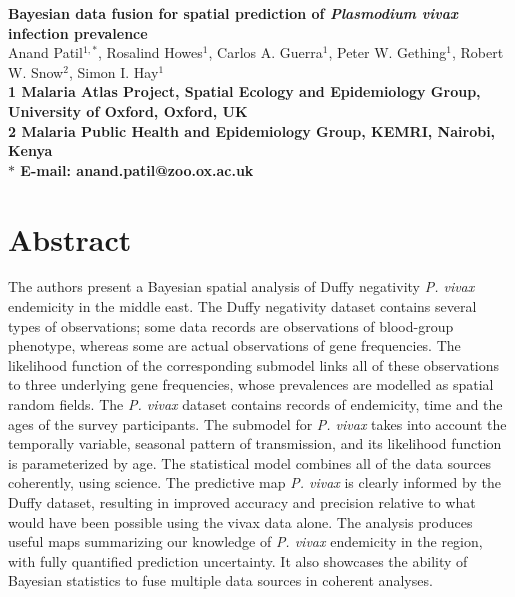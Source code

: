 \documentclass[10pt]{article}
\date{}
\begin{document}
\garamond

\begin{flushleft}
{\Large
\textbf{Bayesian data fusion for spatial prediction of \emph{Plasmodium vivax} infection prevalence}
}
\\
Anand Patil$^{1,\ast}$,  
Rosalind Howes$^{1}$,
Carlos A. Guerra$^1$,
Peter W. Gething$^{1}$,
Robert W. Snow$^2$,
Simon I. Hay$^1$
\\
\bf{1} Malaria Atlas Project, Spatial Ecology and Epidemiology Group, University of Oxford, Oxford, UK
\\
\bf{2} Malaria Public Health and Epidemiology Group, KEMRI, Nairobi, Kenya
\\
$\ast$ E-mail: anand.patil@zoo.ox.ac.uk
\end{flushleft}

\section*{Abstract}

The authors present a Bayesian spatial analysis of Duffy negativity \emph{P. vivax} endemicity in the middle east. The Duffy negativity dataset contains several types of observations; some data records are observations of blood-group phenotype, whereas some are actual observations of gene frequencies. The likelihood function of the corresponding submodel links all of these observations to three underlying gene frequencies, whose prevalences are modelled as spatial random fields. The \emph{P. vivax} dataset contains records of endemicity, time and the ages of the survey participants. The submodel for \emph{P. vivax} takes into account the temporally variable, seasonal pattern of transmission, and its likelihood function is parameterized by age. The statistical model combines all of the data sources coherently, using science. The predictive map \emph{P. vivax} is clearly informed by the Duffy dataset, resulting in improved accuracy and precision relative to what would have been possible using the vivax data alone. The analysis produces useful maps summarizing our knowledge of \emph{P. vivax} endemicity in the region, with fully quantified prediction uncertainty. It also showcases the ability of Bayesian statistics to fuse multiple data sources in coherent analyses.
\end{document}
